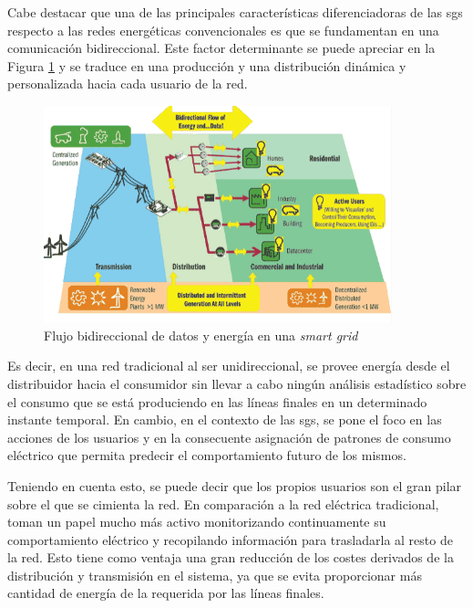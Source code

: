 \vspace{3mm}

Cabe destacar que una de las principales características diferenciadoras de las \gls{sg}s respecto a las redes energéticas convencionales es que se fundamentan en una comunicación bidireccional. Este factor determinante se puede apreciar en la Figura \ref{fig:bidireccional} y se traduce en una producción y una distribución dinámica y personalizada hacia cada usuario de la red. 

\vspace{3mm}

\begin{figure}[h]
  \centering
  \includegraphics[width=0.9\textwidth]{img/teoria/sg.png}
  \caption{Flujo bidireccional de datos y energía en una \textit{smart grid} \cite{sins}}
  \label{fig:bidireccional}
\end{figure}

\vspace{3mm}

Es decir, en una red tradicional al ser unidireccional, se provee energía desde el distribuidor hacia el consumidor sin llevar a cabo ningún análisis estadístico sobre el consumo que se está produciendo en las líneas finales en un determinado instante temporal. En cambio, en el contexto de las \gls{sg}s, se pone el foco en las acciones de los usuarios y en la consecuente asignación de patrones de consumo eléctrico que permita predecir el comportamiento futuro de los mismos. \cite{convencional}

\vspace{3mm}

Teniendo en cuenta esto, se puede decir que los propios usuarios son el gran pilar sobre el que se cimienta la red. En comparación a la red eléctrica tradicional, toman un papel mucho más activo monitorizando continuamente su comportamiento eléctrico y recopilando información para trasladarla al resto de la red. Esto tiene como ventaja una gran reducción de los costes derivados de la distribución y transmisión en el sistema, ya que se evita proporcionar más cantidad de energía de la requerida por las líneas finales. \cite{iotfutura}


